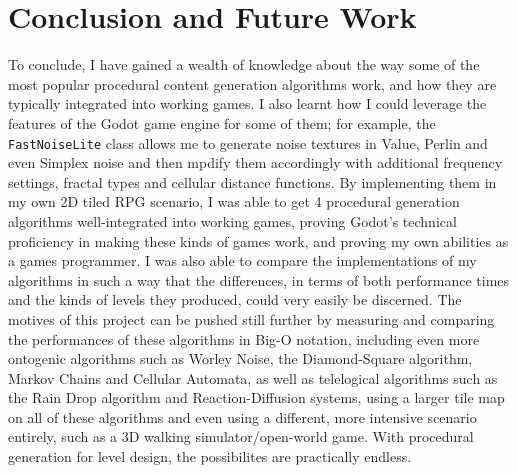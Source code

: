 \chapter{Conclusion and Future Work} \label{Conclusion}


To conclude, I have gained a wealth of knowledge about the way some of the most popular procedural content generation algorithms work, and how they are typically integrated into working games. I also learnt how I could leverage the features of the Godot game engine for some of them; for example, the \verb|FastNoiseLite| class allows me to generate noise textures in Value, Perlin and even Simplex noise and then mpdify them accordingly with additional frequency settings, fractal types and cellular distance functions. By implementing them in my own 2D tiled RPG scenario, I was able to get 4 procedural generation algorithms well-integrated into working games, proving Godot's technical proficiency in making these kinds of games work, and proving my own abilities as a games programmer. I was also able to compare the implementations of my algorithms in such a way that the differences, in terms of both performance times and the kinds of levels they produced, could very easily be discerned. The motives of this project can be pushed still further by measuring and comparing the performances of these algorithms in Big-O notation, including even more ontogenic algorithms such as Worley Noise, the Diamond-Square algorithm, Markov Chains and Cellular Automata, as well as telelogical algorithms such as the Rain Drop algorithm and Reaction-Diffusion systems, using a larger tile map on all of these algorithms and even using a different, more intensive scenario entirely, such as a 3D walking simulator/open-world game. With procedural generation for level design, the possibilites are practically endless.